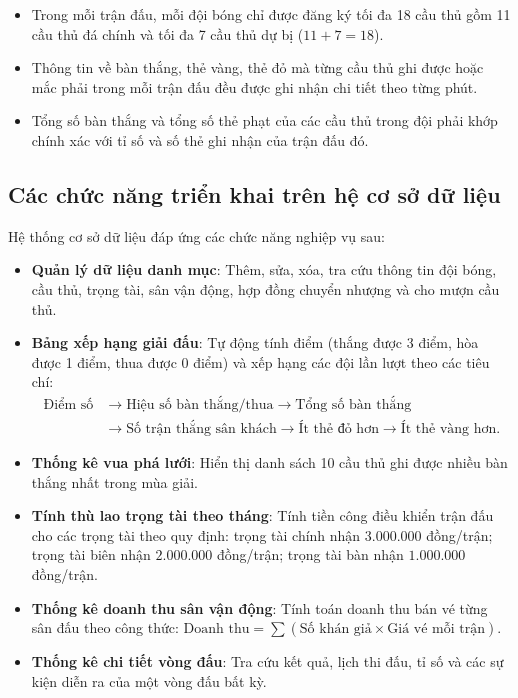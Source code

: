 \begin{enumerate}
\begin{itemize}
        \item Trong mỗi trận đấu, mỗi đội bóng chỉ được đăng ký tối đa 18 cầu thủ gồm 11 cầu thủ đá chính và tối đa 7 cầu thủ dự bị ($11 + 7 = 18$).
        \item Thông tin về bàn thắng, thẻ vàng, thẻ đỏ mà từng cầu thủ ghi được hoặc mắc phải trong mỗi trận đấu đều được ghi nhận chi tiết theo từng phút.
        \item Tổng số bàn thắng và tổng số thẻ phạt của các cầu thủ trong đội phải khớp chính xác với tỉ số và số thẻ ghi nhận của trận đấu đó.
    \end{itemize}
\end{enumerate}

\subsection{Các chức năng triển khai trên hệ cơ sở dữ liệu}
Hệ thống cơ sở dữ liệu đáp ứng các chức năng nghiệp vụ sau:
\begin{itemize}
    \item \textbf{Quản lý dữ liệu danh mục}: Thêm, sửa, xóa, tra cứu thông tin đội bóng, cầu thủ, trọng tài, sân vận động, hợp đồng chuyển nhượng và cho mượn cầu thủ.
    \item \textbf{Bảng xếp hạng giải đấu}: Tự động tính điểm (thắng được 3 điểm, hòa được 1 điểm, thua được 0 điểm) và xếp hạng các đội lần lượt theo các tiêu chí:
    \begin{align*}
        \text{Điểm số} &\rightarrow \text{Hiệu số bàn thắng/thua} \rightarrow \text{Tổng số bàn thắng} \\
        &\rightarrow \text{Số trận thắng sân khách} \rightarrow \text{Ít thẻ đỏ hơn} \rightarrow \text{Ít thẻ vàng hơn}.
    \end{align*}
    \item \textbf{Thống kê vua phá lưới}: Hiển thị danh sách 10 cầu thủ ghi được nhiều bàn thắng nhất trong mùa giải.
    \item \textbf{Tính thù lao trọng tài theo tháng}: Tính tiền công điều khiển trận đấu cho các trọng tài theo quy định: trọng tài chính nhận $3.000.000$ đồng/trận; trọng tài biên nhận $2.000.000$ đồng/trận; trọng tài bàn nhận $1.000.000$ đồng/trận.
    \item \textbf{Thống kê doanh thu sân vận động}: Tính toán doanh thu bán vé từng sân đấu theo công thức: $\text{Doanh thu} = \sum (\text{Số khán giả} \times \text{Giá vé mỗi trận})$.
    \item \textbf{Thống kê chi tiết vòng đấu}: Tra cứu kết quả, lịch thi đấu, tỉ số và các sự kiện diễn ra của một vòng đấu bất kỳ.
\end{itemize}

